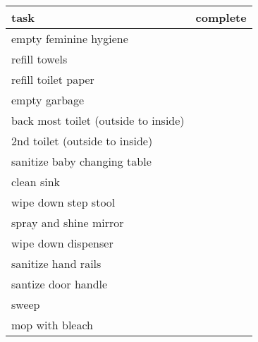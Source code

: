\begin{longtable}[c]{@{}ll@{}}
\toprule
task & complete\tabularnewline
\midrule
\endhead
empty feminine hygiene &\tabularnewline
refill towels &\tabularnewline
refill toilet paper &\tabularnewline
empty garbage &\tabularnewline
back most toilet (outside to inside) &\tabularnewline
2nd toilet (outside to inside) &\tabularnewline
sanitize baby changing table &\tabularnewline
clean sink &\tabularnewline
wipe down step stool &\tabularnewline
spray and shine mirror &\tabularnewline
wipe down dispenser &\tabularnewline
sanitize hand rails &\tabularnewline
santize door handle &\tabularnewline
sweep &\tabularnewline
mop with bleach &\tabularnewline
\bottomrule
\end{longtable}
